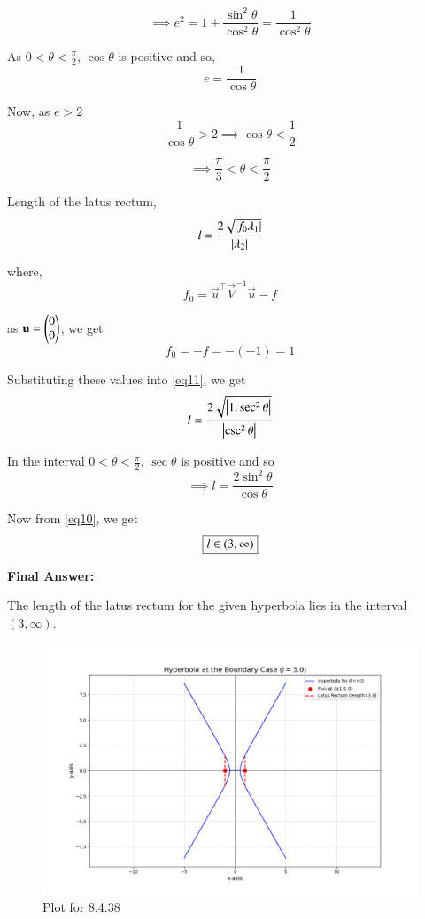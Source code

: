 \documentclass[journal,12pt,onecolumn]{IEEEtran}
\theoremstyle{remark}
\begin{document}
\begin{equation}
    \implies e^2 = 1 + \frac{\sin^2{\theta}}{\cos^2{\theta}} = \frac{1}{\cos^2{\theta}}
\end{equation}

As $0 < \theta < \frac{\pi}{2}$, $\cos{\theta}$ is positive and so,
\begin{equation}
    e = \frac{1}{\cos{\theta}}
\end{equation}

Now, as $e > 2$
\begin{equation}
    \frac{1}{\cos{\theta}} > 2 \implies \cos{\theta} < \frac{1}{2}
\end{equation}

\begin{equation}
    \implies \frac{\pi}{3} < \theta < \frac{\pi}{2}
    \label{eq10}
\end{equation}

Length of the latus rectum,
\begin{equation}
    l = \frac{2\sqrt{\left\vert f_0\lambda_1\right\vert}}{\left\vert\lambda_2\right\vert}
    \label{eq11}
\end{equation}

where,
\begin{equation}
    f_0 = \vec{u}^{\top}\vec{V}^{-1}\vec{u} - f
\end{equation}

as $\mathbf{u} = \begin{pmatrix}0\\0\end{pmatrix}$, we get
\begin{equation}
    f_0 = -f = -(-1) = 1
\end{equation}

Substituting these values into \eqref{eq11}, we get
\begin{equation}
    l = \frac{2\sqrt{\left\vert1.\sec^2\theta\right\vert}}{\left\vert\csc^2\theta\right\vert}
\end{equation}

In the interval $0 < \theta < \frac{\pi}{2}$, $\sec\theta$ is positive and so
\begin{equation}
    \implies l = \frac{2\sin^2{\theta}}{\cos{\theta}}
\end{equation}

Now from \eqref{eq10}, we get
\begin{equation}
    \fbox{$l \in (3,\infty)$}
\end{equation}

\textbf{Final Answer: }

The length of the latus rectum for the given hyperbola lies in the interval $(3,\infty)$.

\begin{figure}[H]
    \centering
    \includegraphics[width=0.75\columnwidth]{figs/1.png}
    \caption{Plot for 8.4.38}
\end{figure}
\end{document}
